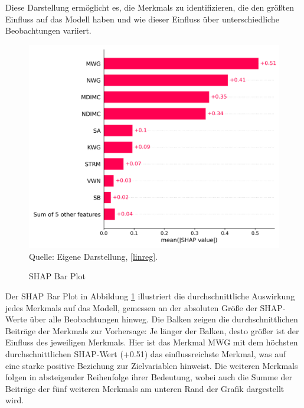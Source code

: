 Diese Darstellung ermöglicht es, die Merkmals zu identifizieren, 
die den größten Einfluss auf das Modell haben und wie dieser Einfluss über 
unterschiedliche Beobachtungen variiert.

\begin{figure}[!h]
    \caption{SHAP Bar Plot}
    \includegraphics[width=1\textwidth]{../scripts/images/shap_bar_plot_gpu.png}
    Quelle: Eigene Darstellung, \ref{linreg}.
    \label{pic:shap_bar}
\end{figure}

Der SHAP Bar Plot in Abbildung \ref{pic:shap_bar} illustriert die durchschnittliche 
Auswirkung jedes Merkmals auf das Modell, gemessen an der absoluten Größe der SHAP-Werte 
über alle Beobachtungen hinweg. Die Balken zeigen die durchschnittlichen Beiträge der 
Merkmals zur Vorhersage: Je länger der Balken, desto größer ist der Einfluss des jeweiligen Merkmals. 
Hier ist das Merkmal MWG mit dem höchsten durchschnittlichen SHAP-Wert (+0.51) das einflussreichste 
Merkmal, was auf eine starke positive Beziehung zur Zielvariablen hinweist. Die weiteren Merkmals 
folgen in absteigender Reihenfolge ihrer Bedeutung, wobei auch die Summe der Beiträge der 
fünf weiteren Merkmals am unteren Rand der Grafik dargestellt wird.
